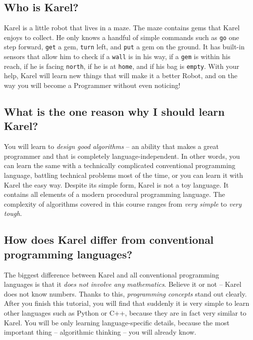 \documentclass[article,A4,12pt]{llncs}
\begin{document}
\subsection{Who is Karel?}

Karel is a little robot that lives in a maze. The maze contains gems that Karel enjoys to collect. 
He only knows a handful of simple commands such as {\tt go} one step forward, {\tt get} a gem, 
{\tt turn} left, and {\tt put} a gem on the ground. It has built-in sensors that allow him to 
check if a {\tt wall} is in his way, if a {\tt gem} is within his reach, if he is facing {\tt north}, 
if he is at {\tt home}, and if his bag is {\tt empty}. With your help, Karel will learn new things 
that will make it a better Robot, and on the way you will become a Programmer without even noticing! 

\subsection{What is the one reason why I should learn Karel?}

You will learn to {\em design good algorithms} -- an ability that makes
a great programmer and that is completely language-independent. In other 
words, you can learn the same with a technically complicated conventional 
programming language, battling technical problems most of the time,
or you can learn it with Karel the easy way.
Despite its simple form, Karel is not a toy language. It contains all elements 
of a modern procedural programming language. The complexity of algorithms 
covered in this course ranges from {\em very simple} to {\em very tough}.

\subsection{How does Karel differ from conventional programming languages?}

The biggest difference between Karel and all conventional 
programming languages is that it {\em does not involve any mathematics}.
Believe it or not -- Karel does not know numbers. Thanks 
to this, {\em programming concepts} stand out clearly. 
After you finish this tutorial, you will find that suddenly it is very simple 
to learn other languages such as Python or C++, because they are in fact 
very similar to Karel. You will be only learning language-specific details, 
because the most important thing -- algorithmic thinking -- you will already 
know.
 
\end{document}
